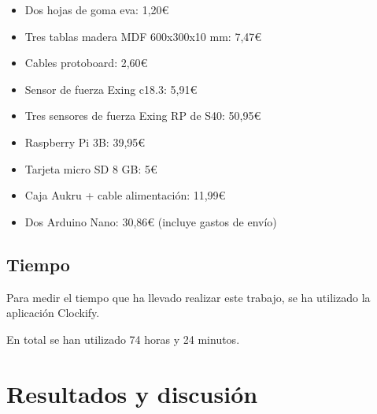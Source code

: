 \documentclass{article}
\begin{document}
            \begin{itemize}
                \item Dos hojas de goma eva: 1,20\euro{}
                \item Tres tablas madera MDF 600x300x10 mm: 7,47\euro{}
                \item Cables protoboard: 2,60\euro{}
                \item Sensor de fuerza Exing c18.3: 5,91\euro{}
                \item Tres sensores de fuerza Exing RP de S40: 50,95\euro{}
                \item Raspberry Pi 3B: 39,95\euro{}
                \item Tarjeta micro SD 8 GB: 5\euro{}
                \item Caja Aukru + cable alimentación: 11,99\euro{}
                \item Dos Arduino Nano: 30,86\euro{} (incluye gastos de envío)
            \end{itemize}


        \subsection{Tiempo} %
        \label{sub:Tiempo}

            Para medir el tiempo que ha llevado realizar este trabajo, se ha utilizado la aplicación
            Clockify\cite{clockify}.\newline

            En total se han utilizado 74 horas y 24 minutos.%



\section{Resultados y discusión}
\label{sec:ResultadosyDiscusion}
\end{document}
